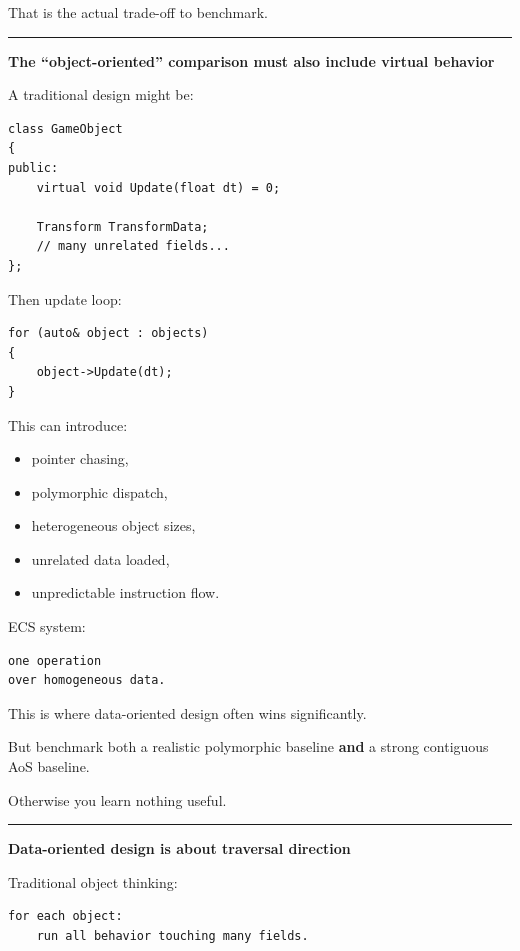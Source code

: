 That is the actual trade-off to benchmark.

\begin{center}\rule{0.5\linewidth}{0.5pt}\end{center}

\textbf{The ``object-oriented'' comparison must also include virtual behavior}

A traditional design might be:

\begin{verbatim}
class GameObject
{
public:
    virtual void Update(float dt) = 0;

    Transform TransformData;
    // many unrelated fields...
};
\end{verbatim}

Then update loop:

\begin{verbatim}
for (auto& object : objects)
{
    object->Update(dt);
}
\end{verbatim}

This can introduce:

\begin{itemize}
\tightlist
\item
  pointer chasing,
\item
  polymorphic dispatch,
\item
  heterogeneous object sizes,
\item
  unrelated data loaded,
\item
  unpredictable instruction flow.
\end{itemize}

ECS system:

\begin{verbatim}
one operation
over homogeneous data.
\end{verbatim}

This is where data-oriented design often wins significantly.

But benchmark both a realistic polymorphic baseline \textbf{and} a strong contiguous AoS baseline.

Otherwise you learn nothing useful.

\begin{center}\rule{0.5\linewidth}{0.5pt}\end{center}

\textbf{Data-oriented design is about traversal direction}

Traditional object thinking:

\begin{verbatim}
for each object:
    run all behavior touching many fields.
\end{verbatim}


